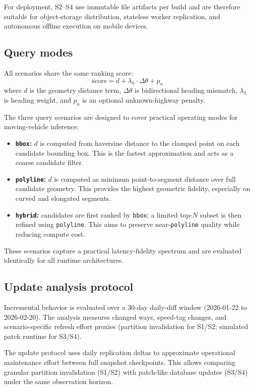 \documentclass[conference]{IEEEtran}
\begin{document}
For deployment, S2--S4 use immutable file artifacts per build and are therefore suitable for object-storage distribution, stateless worker replication, and autonomous offline execution on mobile devices.

\subsection{Query modes}
All scenarios share the same ranking score:
\begin{equation}
\text{score} = d + \lambda_h \cdot \Delta \theta + p_u
\label{eq:score}
\end{equation}
where \(d\) is the geometry distance term, \(\Delta \theta\) is bidirectional heading mismatch, \(\lambda_h\) is heading weight, and \(p_u\) is an optional unknown-highway penalty.

The three query scenarios are designed to cover practical operating modes for moving-vehicle inference:
\begin{itemize}
\item \textbf{\texttt{bbox}:} \(d\) is computed from haversine distance to the clamped point on each candidate bounding box. This is the fastest approximation and acts as a coarse candidate filter.
\item \textbf{\texttt{polyline}:} \(d\) is computed as minimum point-to-segment distance over full candidate geometry. This provides the highest geometric fidelity, especially on curved and elongated segments.
\item \textbf{\texttt{hybrid}:} candidates are first ranked by \texttt{bbox}; a limited top-\(N\) subset is then refined using \texttt{polyline}. This aims to preserve near-\texttt{polyline} quality while reducing compute cost.
\end{itemize}

These scenarios capture a practical latency-fidelity spectrum and are evaluated identically for all runtime architectures.

\subsection{Update analysis protocol}
Incremental behavior is evaluated over a 30-day daily-diff window (2026-01-22 to 2026-02-20). The analysis measures changed ways, speed-tag changes, and scenario-specific refresh effort proxies (partition invalidation for S1/S2; simulated patch runtime for S3/S4).

The update protocol uses daily replication deltas to approximate operational maintenance effort between full snapshot checkpoints. This allows comparing granular partition invalidation (S1/S2) with patch-like database updates (S3/S4) under the same observation horizon.
\end{document}
